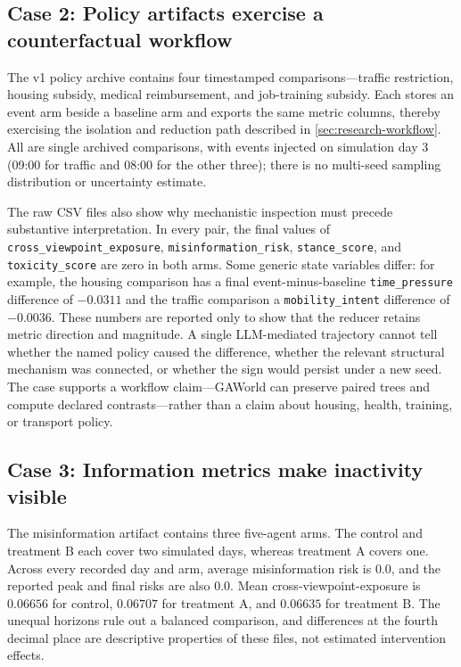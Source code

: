 \subsection{Case 2: Policy artifacts exercise a counterfactual workflow}

The v1 policy archive contains four timestamped comparisons---traffic
restriction, housing subsidy, medical reimbursement, and job-training
subsidy.  Each stores an event arm beside a baseline arm and exports the
same metric columns, thereby exercising the isolation and reduction path
described in \cref{sec:research-workflow}.  All are single archived
comparisons, with events injected on simulation day 3 (09:00 for traffic
and 08:00 for the other three); there is no multi-seed sampling
distribution or uncertainty estimate.

The raw CSV files also show why mechanistic inspection must precede
substantive interpretation.  In every pair, the final values of
\texttt{cross\_viewpoint\_exposure}, \texttt{misinformation\_risk},
\texttt{stance\_score}, and \texttt{toxicity\_score} are zero in both
arms.  Some generic state variables differ: for example, the housing
comparison has a final event-minus-baseline \texttt{time\_pressure}
difference of $-0.0311$ and the traffic comparison a
\texttt{mobility\_intent} difference of $-0.0036$.  These numbers are
reported only to show that the reducer retains metric direction and
magnitude.  A single LLM-mediated trajectory cannot tell whether the
named policy caused the difference, whether the relevant structural
mechanism was connected, or whether the sign would persist under a new
seed.  The case supports a workflow claim---GAWorld can preserve paired
trees and compute declared contrasts---rather than a claim about
housing, health, training, or transport policy.

\subsection{Case 3: Information metrics make inactivity visible}

The misinformation artifact contains three five-agent arms.  The control
and treatment B each cover two simulated days, whereas treatment A covers
one.  Across every recorded day and arm, average misinformation risk is
$0.0$, and the reported peak and final risks are also $0.0$.  Mean
cross-viewpoint-exposure is $0.06656$ for control, $0.06707$ for
treatment A, and $0.06635$ for treatment B.  The unequal horizons rule
out a balanced comparison, and differences at the fourth decimal place
are descriptive properties of these files, not estimated intervention
effects.

